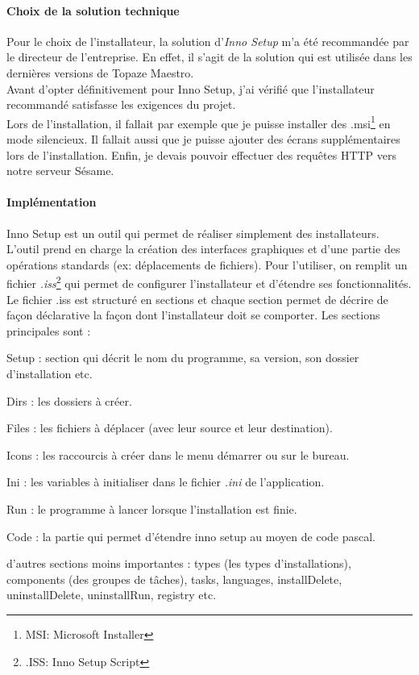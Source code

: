 \paragraph*{Choix de la solution technique\\}
Pour le choix de l'installateur, la solution d'\textit{Inno Setup} m'a été recommandée par le directeur de l'entreprise. En effet, il s'agit de la solution qui est utilisée dans les dernières versions de Topaze Maestro.\\
Avant d'opter définitivement pour Inno Setup, j'ai vérifié que l'installateur recommandé satisfasse les exigences du projet.\\ Lors de l'installation, il fallait par exemple que je puisse installer des .msi\footnote{MSI: Microsoft Installer} en mode silencieux. Il fallait aussi que je puisse ajouter des écrans supplémentaires lors de l'installation. Enfin, je devais pouvoir effectuer des requêtes HTTP vers notre serveur Sésame.

\paragraph*{Implémentation\\}
Inno Setup est un outil qui permet de réaliser simplement des installateurs. L'outil prend en charge la création des interfaces graphiques et d'une partie des opérations standards (ex: déplacements de fichiers). Pour l'utiliser, on remplit un fichier \textit{.iss}\footnote{.ISS: Inno Setup Script} qui permet de configurer l'installateur et d'étendre ses fonctionnalités. Le fichier .iss est structuré en sections et chaque section permet de décrire de façon déclarative la façon dont l'installateur doit se comporter. Les sections principales sont : 
\begin{sitemize}
\item Setup : section qui décrit le nom du programme, sa version, son dossier d'installation etc.
\item Dirs : les dossiers à créer.
\item Files : les fichiers à déplacer (avec leur source et leur destination).
\item Icons : les raccourcis à créer dans le menu démarrer ou sur le bureau.
\item Ini : les variables à initialiser dans le fichier \textit{.ini} de l'application.
\item Run : le programme à lancer lorsque l'installation est finie.
\item Code : la partie qui permet d'étendre inno setup au moyen de code pascal.
\item d'autres sections moins importantes : types (les types d'installations), components (des groupes de tâches), tasks, languages, installDelete, uninstallDelete, uninstallRun, registry etc.
\end{sitemize}  

